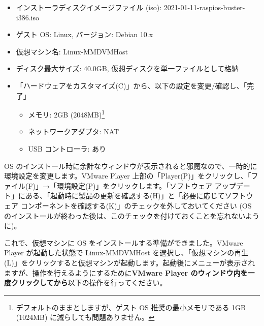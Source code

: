 \documentclass[a4j,oneside]{ujbook}
\begin{document}
\begin{itemize}
 \item インストーラディスクイメージファイル (iso): 2021-01-11-raspios-buster-i386.iso
 \item ゲスト OS: Linux, バージョン: Debian 10.x
 \item 仮想マシン名: Linux-MMDVMHost
 \item ディスク最大サイズ: 40.0GB, 仮想ディスクを単一ファイルとして格納
 \item 「ハードウェアをカスタマイズ(C)」から、以下の設定を変更/確認し、「完了」
 \begin{itemize}
  \item メモリ: 2GB (2048MB)\footnote{デフォルトのままとしますが、ゲスト OS 推奨の最小メモリである 1GB (1024MB) に減らしても問題ありません。}
  \item ネットワークアダプタ: NAT
  \item USB コントローラ: あり
 \end{itemize}
\end{itemize}

OS のインストール時に余計なウィンドウが表示されると邪魔なので、一時的に環境設定を変更します。VMware Player 上部の「Player(P)」をクリックし、「ファイル(F)」→「環境設定(P)」をクリックします。「ソフトウェア アップデート」にある、「起動時に製品の更新を確認する(H)」と「必要に応じてソフトウェア コンポーネントを確認する(K)」のチェックを外しておいてください (OS のインストールが終わった後は、このチェックを付けておくことを忘れないように)。

これで、仮想マシンに OS をインストールする準備ができました。VMware Player が起動した状態で Linux-MMDVMHost を選択し、「仮想マシンの再生(L)」をクリックすると仮想マシンが起動します。起動後にメニューが表示されますが、操作を行えるようにするために\textbf{VMware Player のウィンドウ内を一度クリックしてから}以下の操作を行ってください。
\end{document}
